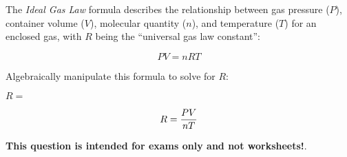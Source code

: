 

The {\it Ideal Gas Law} formula describes the relationship between gas pressure ($P$), container volume ($V$), molecular quantity ($n$), and temperature ($T$) for an enclosed gas, with $R$ being the ``universal gas law constant'':

$$PV = nRT$$

Algebraically manipulate this formula to solve for $R$:

\vskip 20pt

$R = $







$$R = {PV \over nT}$$







{\bf This question is intended for exams only and not worksheets!}.



